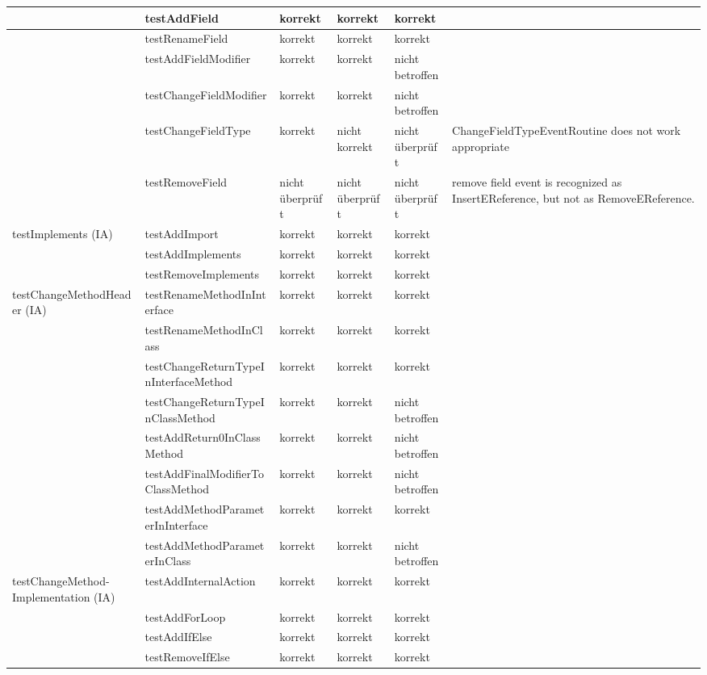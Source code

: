 \begin{tiny}
\begin{longtable}[c]{|p{2.2cm}|p{3.5cm}|p{1cm}|p{1cm}|p{1cm}|p{4cm}|}
 & testAddField & korrekt & korrekt & korrekt &  \\ \hline
 & testRenameField & korrekt & korrekt & korrekt &  \\ \hline
 & testAddFieldModifier & korrekt & korrekt & nicht 			betroffen &  \\ \hline
 & testChangeFieldModifier & korrekt & korrekt & nicht 			betroffen &  \\ \hline
 & testChangeFieldType & korrekt & nicht korrekt  & nicht überprüft & ChangeFieldTypeEventRoutine does not work appropriate \\ \hline
 & testRemoveField & nicht 			überprüft & nicht 			überprüft & nicht 			überprüft & remove 			field event is recognized as InsertEReference, but not as 			RemoveEReference. \\ \hline
testImplements 			(IA) & testAddImport & korrekt & korrekt & korrekt &  \\ \hline
 & testAddImplements & korrekt & korrekt & korrekt &  \\ \hline
 & testRemoveImplements & korrekt & korrekt & korrekt &  \\ \hline
testChangeMethodHeader 			(IA) & testRenameMethodInInterface & korrekt & korrekt & korrekt &  \\ \hline
 & testRenameMethodInClass & korrekt & korrekt & korrekt &  \\ \hline
 & testChangeReturnTypeInInterfaceMethod & korrekt & korrekt & korrekt &  \\ \hline
 & testChangeReturnTypeInClassMethod & korrekt & korrekt & nicht 			betroffen &  \\ \hline
 & testAddReturn0InClassMethod & korrekt & korrekt & nicht 			betroffen &  \\ \hline
 & testAddFinalModifierToClassMethod & korrekt & korrekt & nicht 			betroffen &  \\ \hline
 & testAddMethodParameterInInterface & korrekt & korrekt & korrekt &  \\ \hline
 & testAddMethodParameterInClass & korrekt & korrekt & nicht 			betroffen &  \\ \hline
testChangeMethod- Implementation 			(IA) & testAddInternalAction & korrekt & korrekt & korrekt &  \\ \hline
 & testAddForLoop & korrekt & korrekt & korrekt &  \\ \hline
 & testAddIfElse & korrekt & korrekt & korrekt &  \\ \hline
 & testRemoveIfElse & korrekt & korrekt & korrekt &  \\ \hline

\end{longtable}
\end{tiny}
